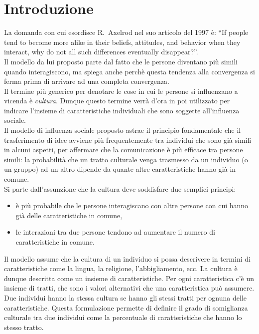 \documentclass[a4paper,12pt]{article}
\begin{document}
\section{Introduzione}
La domanda con cui esordisce R.~Axelrod nel suo articolo del 1997 \cite{Axelrod} \`{e}: \textquotedblleft If people tend to become 
more alike in their beliefs, attitudes, and behavior when they interact, why do not all such differences eventually disappear?\textquotedblright .
\\Il modello da lui proposto parte dal fatto che le persone diventano pi\`{u} simili quando interagiscono, ma spiega anche perch\`{e}
questa tendenza alla convergenza si ferma prima di arrivare ad una completa convergenza.
\\Il termine pi\`{u} generico per denotare le cose in cui le persone si influenzano a vicenda \`{e} \textit{cultura}.
Dunque questo termine verr\`{a} d'ora in poi utilizzato per indicare l'insieme di caratteristiche individuali che sono soggette all'influenza sociale.
\\Il modello di influenza sociale proposto astrae il principio fondamentale che il trasferimento di idee avviene pi\`{u} frequentemente
tra individui che sono gi\`{a} simili in alcuni aspetti, per affermare che la comunicazione \`{e} pi\`{u} efficace tra persone simili:
la probabilit\`{a} che un tratto culturale venga trasmesso da un individuo (o un gruppo) ad un altro dipende da quante altre caratteristiche
hanno gi\`{a} in comune.
\\Si parte dall'assunzione che la cultura deve soddisfare due semplici principi: 
\begin{itemize}
\item \`{e} pi\`{u} probabile che le persone interagiscano con altre persone con cui hanno gi\`{a} delle caratteristiche in comune,
\item le interazioni tra due persone tendono ad aumentare il numero di caratteristiche in comune.
\end{itemize}
Il modello assume che la cultura di un individuo si possa descrivere in termini di caratteristiche come la lingua, la religione,
l'abbigliamento, ecc. La cultura \`{e} dunque descritta come un insieme di caratteristiche. 
Per ogni caratteristica c'\`{e} un insieme di tratti, che sono i valori alternativi che una caratteristica pu\`{o} assumere.
Due individui hanno la stessa cultura se hanno gli stessi tratti per ognuna delle caratteristiche. 
Questa formulazione permette di definire il grado di somiglianza culturale tra due individui come la percentuale di caratteristiche che hanno lo stesso tratto.
\end{document}
